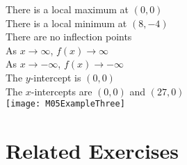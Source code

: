 \documentclass{article}
\begin{document}
\begin{enumerate}
    There is a local maximum at $(0, 0)$ \\
    There is a local minimum at $(8, -4)$ \\
    There are no inflection points \\
    As $x \to \infty$, $f(x) \to \infty$ \\
    As $x \to -\infty$, $f(x) \to -\infty$ \\
    The $y$-intercept is $(0, 0)$ \\
    The $x$-intercepts are $(0, 0)$ and $(27, 0)$ \\
    \texttt{[image: M05ExampleThree]}
\end{enumerate}

\section*{Related Exercises}
\end{document}
